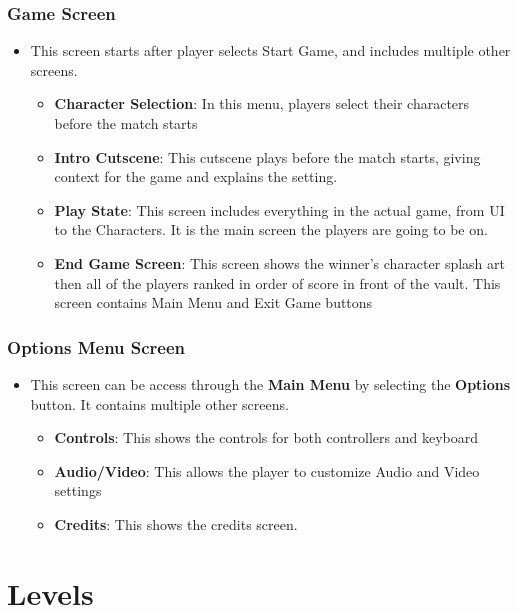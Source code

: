 \documentclass[11pt]{report}
\begin{document}
\subsection{Game Screen}

\begin{itemize}
    \item This screen starts after player selects Start Game, and includes multiple other screens.
    \begin{itemize}    
        \item \textbf{Character Selection}: In this menu, players select their characters before the match starts
        \item \textbf{Intro Cutscene}: This cutscene plays before the match starts, giving context for the game and explains the setting.
        \item \textbf{Play State}: This screen includes everything in the actual game, from UI to the Characters. It is the main screen the players are going to be on.
        \item \textbf{End Game Screen}: This screen shows the winner’s character splash art then all of the players ranked in order of score in front of the vault. This screen contains Main Menu and Exit Game buttons
    \end{itemize}
\end{itemize}

\subsection{Options Menu Screen}
\begin{itemize}
    \item This screen can be access through the \textbf{Main Menu} by selecting the \textbf{Options} button. It contains multiple other screens.
    \begin{itemize}
        \item \textbf{Controls}: This shows the controls for both controllers and keyboard
        \item \textbf{Audio/Video}: This allows the player to customize Audio and Video settings
        \item \textbf{Credits}: This shows the credits screen.    
    \end{itemize}
\end{itemize}

\chapter{Levels}
\end{document}
